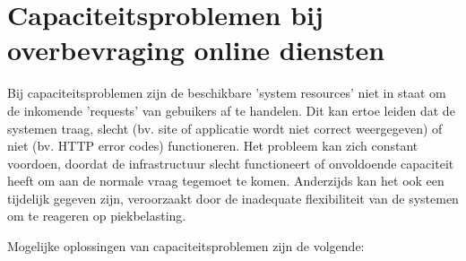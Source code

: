 
\section{Capaciteitsproblemen bij overbevraging online diensten}


Bij capaciteitsproblemen zijn de beschikbare 'system resources'
niet in staat om de inkomende 'requests' van gebuikers af te handelen.
Dit kan ertoe leiden dat de systemen traag, slecht (bv. site of applicatie wordt niet correct
weergegeven) of niet (bv. HTTP error codes) functioneren.
Het probleem kan zich constant voordoen, doordat de infrastructuur slecht
functioneert of onvoldoende capaciteit heeft om aan de normale
vraag tegemoet te komen. Anderzijds kan het ook een tijdelijk gegeven zijn,
veroorzaakt door de inadequate flexibiliteit van de systemen om
te reageren op piekbelasting. \newline

Mogelijke oplossingen van capaciteitsproblemen zijn de volgende:

